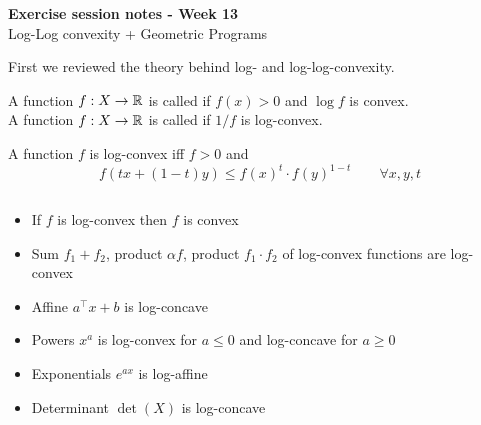 \documentclass[answers]{exam}
\begin{document}
	$ $
	\begin{center}
		\huge \textbf{Exercise session notes - Week 13}  \\ \vspace*{3mm}
        \Large{Log-Log convexity + Geometric Programs}
	\end{center}
	$ $\\

    First we reviewed the theory behind log- and log-log-convexity. 
    \begin{definition}
        A function $f:X\to \mathbb{R}$ is called  if $f(x) > 0$ and $\log f$ is convex. \\ 
        A function $f:X\to \mathbb{R}$ is called  if $1/f$ is log-convex. 
    \end{definition}

    \begin{proposition}
        A function $f$ is log-convex iff $f > 0$ and 
        $$ f\left(tx + (1-t)y\right) \leq f(x)^t \cdot f(y)^{1-t}\qquad \forall x,y,t $$
    \end{proposition}
    \begin{remark} $\ $
        \begin{itemize}
            \item If $f$ is log-convex then $f$ is convex 
            \item Sum $f_1+f_2$, product $\alpha f$, product $f_1\cdot f_2$ of log-convex functions are log-convex 
            \item Affine $a^\top x + b$ is log-concave 
            \item Powers $x^a$ is log-convex for $a\leq 0$ and log-concave for $a \geq 0$
            \item Exponentials $e^{ax}$ is log-affine 
            \item Determinant $\det(X)$ is log-concave
        \end{itemize}
    \end{remark}
\end{document}
